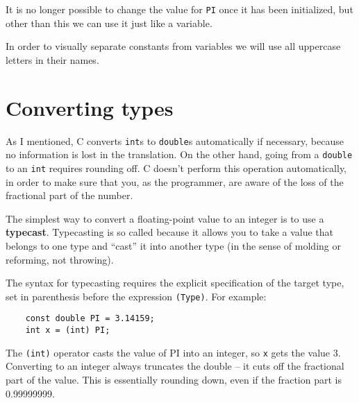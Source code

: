 It is no longer possible to change the value for  {\tt PI} once it has been initialized, but 
other than this we can use it just like a variable.

In order to visually separate constants from variables we will use
all uppercase letters in their names. 



\section{Converting types}
\label{rounding}
\label{typecasting} 

As I mentioned, C converts {\tt int}s
to {\tt double}s automatically if necessary, because no
information is lost in the translation.  On the other hand,
going from a {\tt double} to an {\tt int} requires rounding
off.  C doesn't perform this operation automatically, in
order to make sure that you, as the programmer, are aware
of the loss of the fractional part of the number.

The simplest way to convert a floating-point value to an integer is to
use a {\bf typecast}.  Typecasting is so called because it allows you
to take a value that belongs to one type and ``cast'' it into another
type (in the sense of molding or reforming, not throwing).

The syntax for typecasting requires the explicit specification of
the target type, set in parenthesis before the expression {\tt (Type)}.
For example:

\begin{verbatim}
    const double PI = 3.14159;
    int x = (int) PI;
\end{verbatim}
%
The {\tt (int)} operator casts the value of PI into an integer, so {\tt x} gets the value
3.  Converting to an integer always truncates the double -- it cuts off the fractional part of the value. 
This is essentially  rounding down, even if the fraction part is 0.99999999. 

